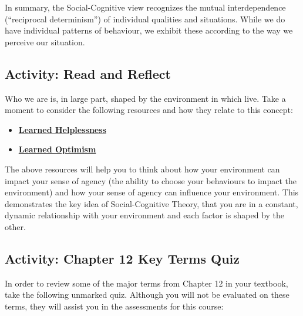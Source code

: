 \documentclass[
]{book}
\providecommand{\tightlist}{%
  \setlength{\itemsep}{0pt}\setlength{\parskip}{0pt}}
\begin{document}
In summary, the Social-Cognitive view recognizes the mutual interdependence (``reciprocal determinism'') of individual qualities and situations. While we do have individual patterns of behaviour, we exhibit these according to the way we perceive our situation.

\hypertarget{activity-read-and-reflect-5}{%
\subsection*{Activity: Read and Reflect}\label{activity-read-and-reflect-5}}

\begin{reflect}
Who we are is, in large part, shaped by the environment in which live. Take a moment to consider the following resources and how they relate to this concept:

\begin{itemize}
\tightlist
\item
  \href{http://www.ldonline.org/article/6154/}{\textbf{Learned Helplessness}}\\
\item
  \href{https://nesslabs.com/learned-optimism}{\textbf{Learned Optimism}}
\end{itemize}

The above resources will help you to think about how your environment can impact your sense of agency (the ability to choose your behaviours to impact the environment) and how your sense of agency can influence your environment. This demonstrates the key idea of Social-Cognitive Theory, that you are in a constant, dynamic relationship with your environment and each factor is shaped by the other.
\end{reflect}

\hypertarget{activity-chapter-12-key-terms-quiz}{%
\subsection*{Activity: Chapter 12 Key Terms Quiz}\label{activity-chapter-12-key-terms-quiz}}

\begin{reflect}
In order to review some of the major terms from Chapter 12 in your textbook, take the following unmarked quiz. Although you will not be evaluated on these terms, they will assist you in the assessments for this course:
\end{reflect}
\end{document}
